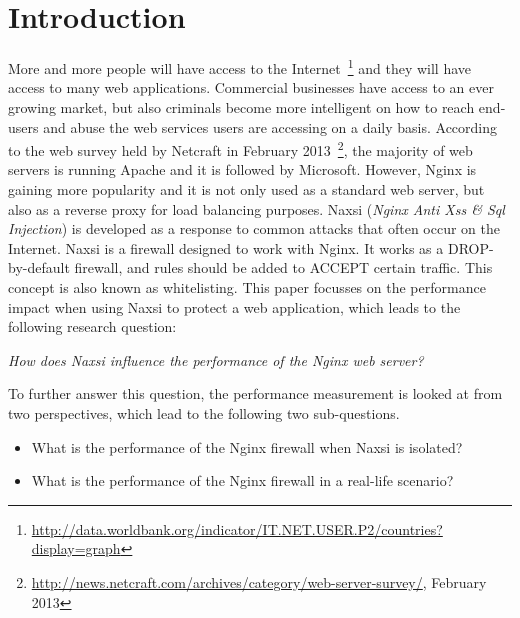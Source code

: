 \documentclass[Introduction]{subfiles}
\begin{document}
\section{Introduction}
\label{sec:Introduction}
More and more people will have access to the Internet~\footnote{\url{http://data.worldbank.org/indicator/IT.NET.USER.P2/countries?display=graph}} and they will have access to many web applications. Commercial businesses have access to an ever growing market, but also criminals become more intelligent on how to reach end-users and abuse the web services users are accessing on a daily basis.
According to the web survey held by Netcraft in February 2013~\footnote{\url{http://news.netcraft.com/archives/category/web-server-survey/}, February 2013}, the majority of web servers is running Apache and it is followed by Microsoft. However, Nginx is gaining more popularity and it is not only used as a standard web server, but also as a reverse proxy for load balancing purposes. Naxsi (\emph{Nginx Anti Xss \& Sql Injection}) is developed as a response to common attacks that often occur on the Internet. Naxsi is a firewall designed to work with Nginx. It works as a DROP-by-default firewall, and rules should be added to ACCEPT certain traffic. This concept is also known as whitelisting. This paper focusses on the performance impact when using Naxsi to protect a web application, which leads to the following research question:

\begin{center}
\emph{How does Naxsi influence the performance of the Nginx web server?} 
\end{center}

\noindent
To further answer this question, the performance measurement is looked at from two perspectives, which lead to the following two sub-questions.

\begin{itemize}
\item What is the performance of the Nginx firewall when Naxsi is isolated?
\item What is the performance of the Nginx firewall in a real-life scenario?
\end{itemize}

\end{document}
